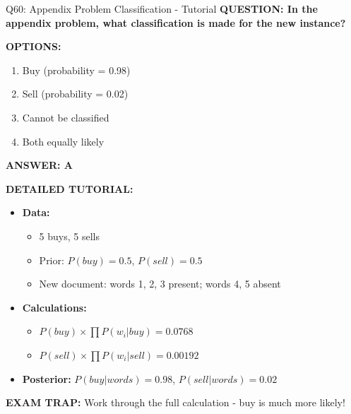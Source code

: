\documentclass[8pt]{beamer}
\begin{document}
	\begin{frame}{Q60: Appendix Problem Classification - Tutorial}
		\fontsize{6.5}{7.5}\selectfont
		\textbf{QUESTION: In the appendix problem, what classification is made for the new instance?}
		
		\vspace{0.1cm}
		\textbf{OPTIONS:}
		\begin{enumerate}
			\item Buy (probability = 0.98)
			\item Sell (probability = 0.02)
			\item Cannot be classified
			\item Both equally likely
		\end{enumerate}
		
		\vspace{0.1cm}
		\textcolor{myblue}{\textbf{ANSWER: A}}
		
		\vspace{0.1cm}
		\textbf{DETAILED TUTORIAL:}
		\begin{itemize}
			\item \textbf{Data:}
			\begin{itemize}
				\item 5 buys, 5 sells
				\item Prior: $P(buy) = 0.5$, $P(sell) = 0.5$
				\item New document: words 1, 2, 3 present; words 4, 5 absent
			\end{itemize}
			\item \textbf{Calculations:}
			\begin{itemize}
				\item $P(buy) \times \prod P(w_i|buy) = 0.0768$
				\item $P(sell) \times \prod P(w_i|sell) = 0.00192$
			\end{itemize}
			\item \textbf{Posterior:} $P(buy|words) = 0.98$, $P(sell|words) = 0.02$
		\end{itemize}
		
		\textcolor{myred}{\textbf{EXAM TRAP:}} Work through the full calculation - \textcolor{myblue}{buy is much more likely}!
	\end{frame}
	
	
\end{document}
